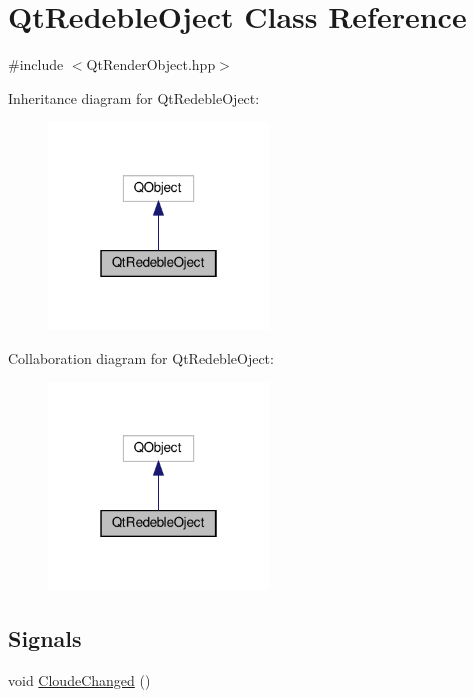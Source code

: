 \hypertarget{classQtRedebleOject}{}\section{Qt\+Redeble\+Oject Class Reference}
\label{classQtRedebleOject}


{\ttfamily \#include $<$Qt\+Render\+Object.\+hpp$>$}



Inheritance diagram for Qt\+Redeble\+Oject\+:
\nopagebreak
\begin{figure}[H]
\begin{center}
\leavevmode
\includegraphics[width=166pt]{classQtRedebleOject__inherit__graph}
\end{center}
\end{figure}


Collaboration diagram for Qt\+Redeble\+Oject\+:
\nopagebreak
\begin{figure}[H]
\begin{center}
\leavevmode
\includegraphics[width=166pt]{classQtRedebleOject__coll__graph}
\end{center}
\end{figure}
\subsection*{Signals}
\begin{DoxyCompactItemize}
\item 
void \mbox{\hyperlink{classQtRedebleOject_a607fb2217538df04cba154ddc680188d}{Cloude\+Changed}} ()
\end{DoxyCompactItemize}
